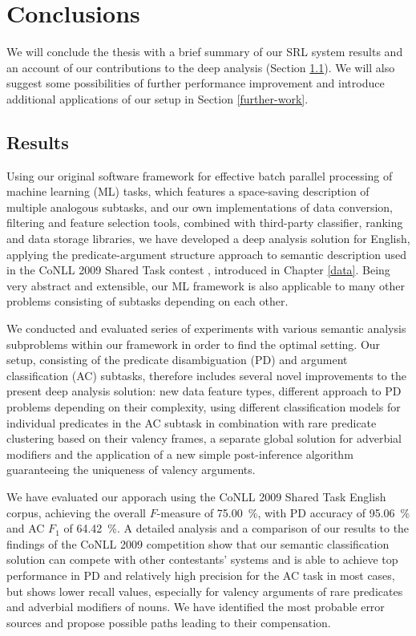 \documentclass[12pt,notitlepage]{report}
\begin{document}
%
%
\chapter{Conclusions}\label{conclusions}
%
%

We will conclude the thesis with a brief summary of our SRL system results and an account of our contributions to the deep analysis (Section \ref{discussion}). We will also suggest some possibilities of further performance improvement and introduce additional applications of our setup in Section \ref{further-work}.

\section{Results}\label{discussion}

Using our original software framework for effective batch parallel processing of machine learning (ML) tasks, which features a space-saving description of multiple analogous subtasks, and our own implementations of data conversion, filtering and feature selection tools, combined with third-party classifier, ranking and data storage libraries, we have developed a deep analysis solution for English, applying the predicate-argument structure approach to semantic description used in the CoNLL 2009 Shared Task contest \citep{hajic09}, introduced in Chapter \ref{data}. Being very abstract and extensible, our ML framework is also applicable to many other problems consisting of subtasks depending on each other.

We conducted and evaluated series of experiments with various semantic ana\-lysis subproblems within our framework in order to find the optimal setting. Our setup, consisting of the predicate disambiguation (PD) and argument classification (AC) subtasks, therefore includes several novel improvements to the present deep analysis solution: new data feature types, different approach to PD problems depending on their complexity, using different classification models for individual predicates in the AC subtask in combination with rare predicate clustering based on their valency frames, a separate global solution for adverbial modifiers and the application of a new simple post-inference algorithm guaranteeing the uniqueness of valency arguments.

We have evaluated our apporach using the CoNLL 2009 Shared Task English corpus, achieving the overall $F$-measure of 75.00~\%, with PD accuracy of 95.06~\% and AC $F_1$ of 64.42~\%. A detailed analysis and a comparison of our results to the findings of the CoNLL 2009 competition show that our semantic classification solution can compete with other contestants' systems and is able to achieve top performance in PD and relatively high precision for the AC task in most cases, but shows lower recall values, especially for valency arguments of rare predicates and adverbial modifiers of nouns. We have identified the most probable error sources and propose possible paths leading to their compensation.
\end{document}
